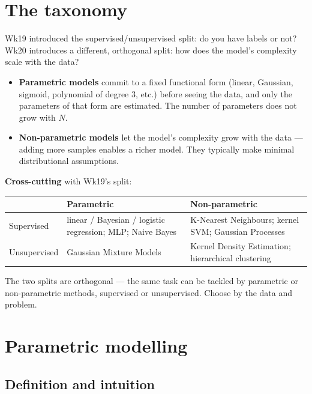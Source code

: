 \documentclass[11pt, a4paper]{article}
\newcommand{\thead}[1]{\textbf{#1}}
\begin{document}
\section{The taxonomy}

Wk19 introduced the supervised/unsupervised split: do you have labels or not? Wk20 introduces a different, orthogonal split: how does the model's complexity scale with the data?

\begin{itemize}
  \item \textbf{Parametric models} commit to a fixed functional form (linear, Gaussian, sigmoid, polynomial of degree 3, etc.) before seeing the data, and only the parameters of that form are estimated. The number of parameters does not grow with $N$.
  \item \textbf{Non-parametric models} let the model's complexity grow with the data — adding more samples enables a richer model. They typically make minimal distributional assumptions.
\end{itemize}

\textbf{Cross-cutting} with Wk19's split:

\begin{tabularx}{\linewidth}{@{}lXX@{}}
\toprule
                          & \thead{Parametric}                                  & \thead{Non-parametric} \\
\midrule
Supervised                & linear / Bayesian / logistic regression; MLP; Naive Bayes & K-Nearest Neighbours; kernel SVM; Gaussian Processes \\
Unsupervised              & Gaussian Mixture Models                                  & Kernel Density Estimation; hierarchical clustering \\
\bottomrule
\end{tabularx}

The two splits are orthogonal — the same task can be tackled by parametric or non-parametric methods, supervised or unsupervised. Choose by the data and problem.

\section{Parametric modelling}

\subsection{Definition and intuition}
\end{document}
